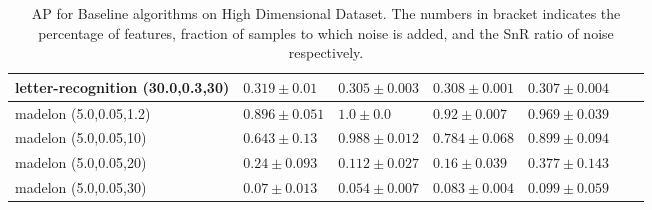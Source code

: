 \begin{footnotesize}
\begin{table}[ht!]
\begin{tabular}{lllllll}
letter-recognition (30.0,0.3,30)& $0.319 \pm 0.01$ &  $0.305 \pm 0.003$ &  $0.308 \pm 0.001$ &  $0.307 \pm 0.004$    \\
\midrule
madelon (5.0,0.05,1.2)& $0.896 \pm 0.051$ &  $1.0 \pm 0.0$ &  $0.92 \pm 0.007$ &  $0.969 \pm 0.039$    \\
madelon (5.0,0.05,10)& $0.643 \pm 0.13$ &  $0.988 \pm 0.012$ &  $0.784 \pm 0.068$ &  $0.899 \pm 0.094$    \\
madelon (5.0,0.05,20)& $0.24 \pm 0.093$ &  $0.112 \pm 0.027$ &  $0.16 \pm 0.039$ &  $0.377 \pm 0.143$    \\
madelon (5.0,0.05,30)& $0.07 \pm 0.013$ &  $0.054 \pm 0.007$ &  $0.083 \pm 0.004$ &  $0.099 \pm 0.059$    \\

				\bottomrule
		\end{tabular}
		\caption{AP for Baseline algorithms on High Dimensional Dataset. The numbers in bracket indicates the percentage of features, fraction of samples to which noise is added, and the SnR ratio of noise respectively.}
\end{table}
\end{footnotesize}


